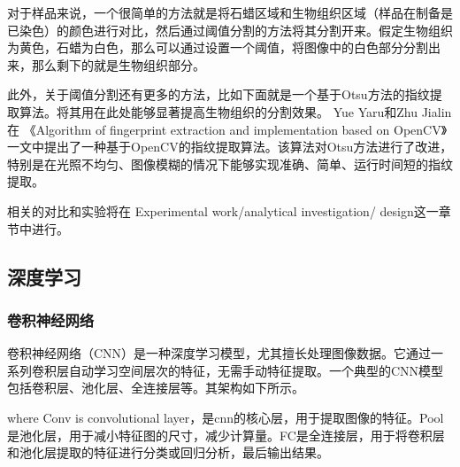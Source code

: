 对于样品来说，一个很简单的方法就是将石蜡区域和生物组织区域（样品在制备是已染色）的颜色进行对比，然后通过阈值分割的方法将其分割开来。假定生物组织为黄色，石蜡为白色，那么可以通过设置一个阈值，将图像中的白色部分分割出来，那么剩下的就是生物组织部分。

此外，关于阈值分割还有更多的方法，比如下面就是一个基于Otsu方法的指纹提取算法。将其用在此处能够显著提高生物组织的分割效果。
Yue Yaru和Zhu Jialin 在 《Algorithm of fingerprint extraction and implementation based on OpenCV》一文中提出了一种基于OpenCV的指纹提取算法。该算法对Otsu方法进行了改进，特别是在光照不均匀、图像模糊的情况下能够实现准确、简单、运行时间短的指纹提取。\cite{3.3}

相关的对比和实验将在 Experimental work/analytical investigation/ design这一章节中进行。

\subsection{深度学习}

\subsubsection{卷积神经网络}

卷积神经网络（CNN）是一种深度学习模型，尤其擅长处理图像数据。它通过一系列卷积层自动学习空间层次的特征，无需手动特征提取。一个典型的CNN模型包括卷积层、池化层、全连接层等。\cite{3.4}其架构如下所示。



where Conv is convolutional layer，是cnn的核心层，用于提取图像的特征。Pool是池化层，用于减小特征图的尺寸，减少计算量。FC是全连接层，用于将卷积层和池化层提取的特征进行分类或回归分析，最后输出结果。

